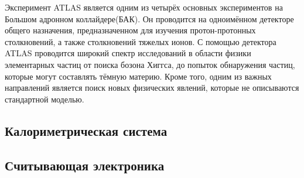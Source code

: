 Эксперимент ATLAS является одним из четырёх основных экспериментов на Большом адронном коллайдере(БАК). Он проводится на одноимённом детекторе общего назначения, предназначенном для изучения протон-протонных столкновений, а также столкновений тяжелых ионов. С помощью детектора ATLAS проводится широкий спектр исследований в области физики элементарных частиц от поиска бозона Хиггса, до попыток обнаружения частиц, которые могут составлять тёмную материю. Кроме того, одним из важных направлений является поиск новых физических явлений, которые не описываются стандартной моделью.\par

\subsection{Калориметрическая система}

\subsection{Считывающая электроника}


